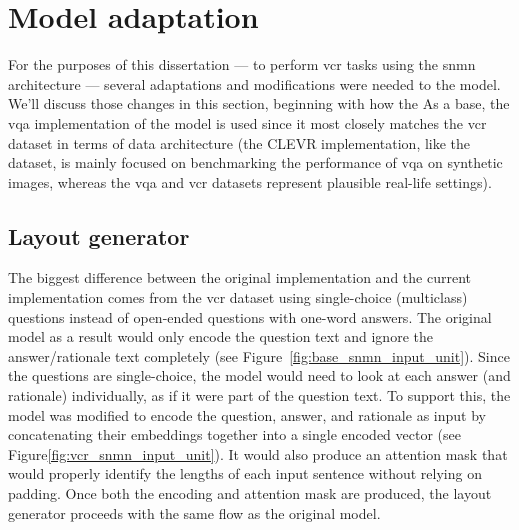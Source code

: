 \section{Model adaptation}
\label{sec:model_adaptation}

For the purposes of this dissertation --- to perform \gls{vcr} tasks using the \gls{snmn} architecture --- several adaptations and modifications were needed to the model.
We'll discuss those changes in this section, beginning with how the
As a base, the \gls{vqa} implementation of the model is used since it most closely matches the \gls{vcr} dataset in terms of data architecture (the CLEVR implementation, like the dataset, is mainly focused on benchmarking the performance of \gls{vqa} on synthetic images, whereas the \gls{vqa} and \gls{vcr} datasets represent plausible real-life settings).

\subsection{Layout generator}
\label{subsec:layout_generator}

The biggest difference between the original implementation and the current implementation comes from the \gls{vcr} dataset using single-choice (multiclass) questions instead of open-ended questions with one-word answers.
The original model as a result would only encode the question text and ignore the answer/rationale text completely (see Figure~\ref{fig:base_snmn_input_unit}).
Since the questions are single-choice, the model would need to look at each answer (and rationale) individually, as if it were part of the question text.
To support this, the model was modified to encode the question, answer, and rationale as input by concatenating their embeddings together into a single encoded vector (see Figure\ref{fig:vcr_snmn_input_unit}).
It would also produce an attention mask that would properly identify the lengths of each input sentence without relying on padding.
Once both the encoding and attention mask are produced, the layout generator proceeds with the same flow as the original model.

